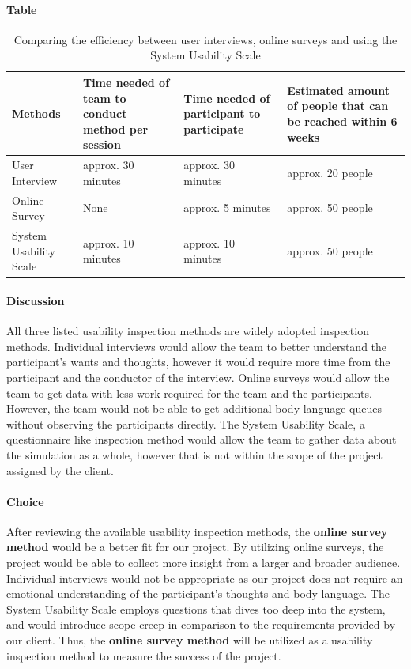 \paragraph{Table}
\begin{center}
\begin{table}[H]
\begin{tabular}{ | m{10em} | m{15em} | m{15em} | m{15em} |  } 
\hline
\textbf{Methods}  & \textbf{Time needed of team to conduct method per session} & \textbf{Time needed of participant to participate} & \textbf{Estimated amount of people that can be reached within 6 weeks} \\ \hline
User Interview & approx. 30 minutes  & approx. 30 minutes & approx. 20 people \\ \hline
Online Survey & None & approx. 5 minutes & approx. 50 people \\ \hline
System Usability Scale & approx. 10 minutes & approx. 10 minutes  &  approx. 50 people \\ \hline 
\end{tabular}
\newline
\caption{Comparing the efficiency between user interviews, online surveys and using the System Usability Scale}
\label{table:inpectionmethods}
\end{table}
\end{center}

\paragraph{Discussion}
All three listed usability inspection methods are widely adopted inspection methods.
Individual interviews would allow the team to better understand the participant's wants and thoughts, however it would require more time from the participant and the conductor of the interview.
Online surveys would allow the team to get data with less work required for the team and the participants.
However, the team would not be able to get additional body language queues without observing the participants directly.
The System Usability Scale, a questionnaire like inspection method would allow the team to gather data about the simulation as a whole, however that is not within the scope of the project assigned by the client.

\paragraph{Choice}
After reviewing the available usability inspection methods, the \textbf{online survey method} would be a better fit for our project.
By utilizing online surveys, the project would be able to collect more insight from a larger and broader audience.
Individual interviews would not be appropriate as our project does not require an emotional understanding of the participant's thoughts and body language.
The System Usability Scale employs questions that dives too deep into the system, and would introduce scope creep in comparison to the requirements provided by our client.
Thus, the \textbf{online survey method} will be utilized as a usability inspection method to measure the success of the project.


